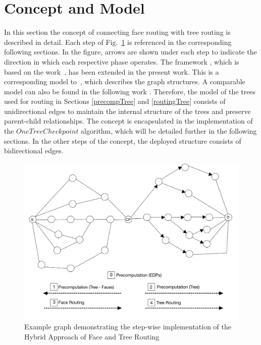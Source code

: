 \documentclass[conference]{IEEEtran}
\begin{document}
\section{Concept and Model}
\label{Concept}
In this section the concept of connecting face routing with tree routing is described in detail. Each step 
of Fig.~\ref{conceptFigure} is referenced in the corresponding following sections. 
In the figure, arrows are shown under each step to indicate the direction in which each respective phase 
operates.
The framework \cite{fast-failover-og}, which is based on the work~\cite{casa}, has been extended in the 
present work. This is a corresponding model to~\cite{casa}, which describes the graph structures. A 
comparable model can also be found in the following work \cite{tree}.
Therefore, the model of the trees used for routing in Sections \ref{precompTree} and \ref{routingTree} 
consists of unidirectional edges to maintain the internal structure of the trees and preserve parent-child 
relationships.
The concept is encapsulated in the implementation of the $OneTreeCheckpoint$ algorithm, which will be detailed 
further in the following sections.
In the other steps of the concept, the deployed structure consists of bidirectional edges.

\begin{figure}[t]
\centering
\includegraphics[scale=0.3]{figures/concept(1).jpeg}
\caption{Example graph demonstrating the step-wise implementation of the Hybrid Approach of Face and Tree Routing}
\label{conceptFigure}
\end{figure}
\end{document}
